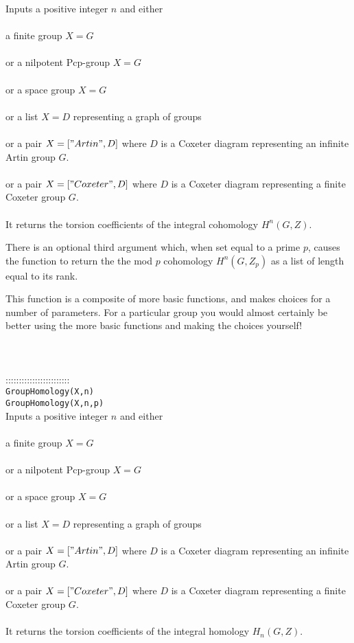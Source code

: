 \documentclass[a4paper,11pt]{report}
\begin{document}
{ Inputs a positive integer $n$ and either \\
 \\
 a finite group $X=G$ \\
 \\
 or a nilpotent Pcp-group $X=G$ \\
 \\
 or a space group $X=G$ \\
 \\
 or a list $X=D$ representing a graph of groups\\
 \\
or a pair $X=["Artin",D]$ where $D$ is a Coxeter diagram representing an infinite Artin group $G$.\\
 \\
or a pair $X=["Coxeter",D]$ where $D$ is a Coxeter diagram representing a finite Coxeter group $G$.\\
 \\
 It returns the torsion coefficients of the integral cohomology $H^n(G,Z)$. 

 There is an optional third argument which, when set equal to a prime $p$, causes the function to return the the mod $p$ cohomology $H^n(G,Z_p)$ as a list of length equal to its rank. 

 This function is a composite of more basic functions, and makes choices for a
number of parameters. For a particular group you would almost certainly be
better using the more basic functions and making the choices yourself! \\
 \\
 \\
 \\
 ::::::::::::::::::::::::\\
 \texttt{GroupHomology(X,n)}\\
 \texttt{GroupHomology(X,n,p)}\\
 

 Inputs a positive integer $n$ and either \\
 \\
 a finite group $X=G$ \\
 \\
 or a nilpotent Pcp-group $X=G$ \\
 \\
 or a space group $X=G$ \\
 \\
 or a list $X=D$ representing a graph of groups\\
 \\
or a pair $X=["Artin",D]$ where $D$ is a Coxeter diagram representing an infinite Artin group $G$.\\
 \\
or a pair $X=["Coxeter",D]$ where $D$ is a Coxeter diagram representing a finite Coxeter group $G$.\\
 \\
 It returns the torsion coefficients of the integral homology $H_n(G,Z)$. 

}
\end{document}
